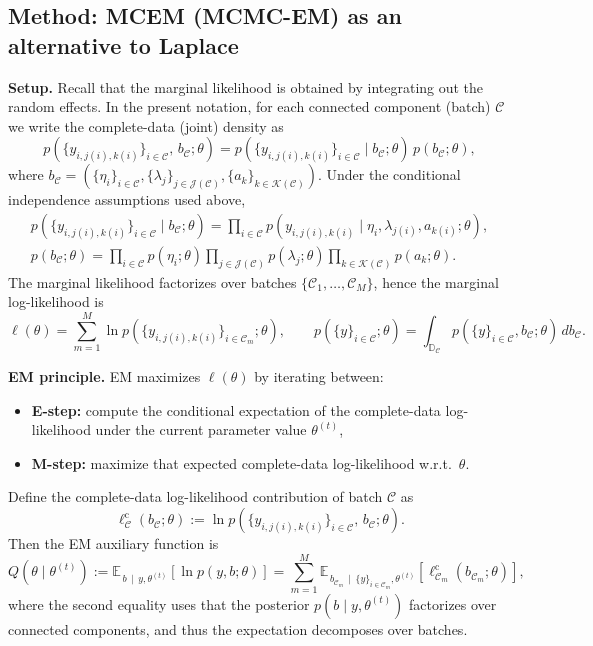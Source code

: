 \documentclass[12pt]{article}
\begin{document}

\subsection*{Method: MCEM (MCMC-EM) as an alternative to Laplace}

\textbf{Setup.}
Recall that the marginal likelihood is obtained by integrating out the random effects. In the present notation, for each connected component (batch) \(\mathcal{C}\) we write the complete-data (joint) density as
\[
p\!\left(\{y_{i,j(i),k(i)}\}_{i\in\mathcal{C}},\, b_{\mathcal{C}};\theta\right)
=
p\!\left(\{y_{i,j(i),k(i)}\}_{i\in\mathcal{C}} \mid b_{\mathcal{C}};\theta\right)\,
p\!\left(b_{\mathcal{C}};\theta\right),
\]
where \(b_{\mathcal{C}}=(\{\eta_i\}_{i\in\mathcal{C}},\{\lambda_j\}_{j\in\mathcal{J}(\mathcal{C})},\{a_k\}_{k\in\mathcal{K}(\mathcal{C})})\).
Under the conditional independence assumptions used above,
\[
\begin{aligned}
    p\!\left(\{y_{i,j(i),k(i)}\}_{i\in\mathcal{C}} \mid b_{\mathcal{C}};\theta\right)
=
\prod_{i\in\mathcal{C}} p\!\left(y_{i,j(i),k(i)} \mid \eta_i,\lambda_{j(i)},a_{k(i)};\theta\right),
\\
p(b_{\mathcal{C}};\theta)
=
\prod_{i\in\mathcal{C}}p(\eta_i;\theta)\prod_{j\in\mathcal{J}(\mathcal{C})}p(\lambda_j;\theta)\prod_{k\in\mathcal{K}(\mathcal{C})}p(a_k;\theta).
\end{aligned}
\]
The marginal likelihood factorizes over batches \(\{\mathcal{C}_1,\dots,\mathcal{C}_M\}\), hence the marginal log-likelihood is
\[
\ell(\theta)
=
\sum_{m=1}^M \ln p\!\left(\{y_{i,j(i),k(i)}\}_{i\in\mathcal{C}_m};\theta\right),
\qquad
p\!\left(\{y\}_{i\in\mathcal{C}};\theta\right)=\int_{\mathbb{D}_{\mathcal{C}}} p\!\left(\{y\}_{i\in\mathcal{C}},b_{\mathcal{C}};\theta\right)\,db_{\mathcal{C}}.
\]

\textbf{EM principle.}
EM maximizes \(\ell(\theta)\) by iterating between:
\begin{itemize}
\item \textbf{E-step:} compute the conditional expectation of the complete-data log-likelihood under the current parameter value \(\theta^{(t)}\),
\item \textbf{M-step:} maximize that expected complete-data log-likelihood w.r.t.\ \(\theta\).
\end{itemize}
Define the complete-data log-likelihood contribution of batch \(\mathcal{C}\) as
\[
\ell_{\mathcal{C}}^{\mathrm{c}}(b_{\mathcal{C}};\theta)
:=
\ln p\!\left(\{y_{i,j(i),k(i)}\}_{i\in\mathcal{C}},\, b_{\mathcal{C}};\theta\right).
\]
Then the EM auxiliary function is
\[
Q(\theta\mid\theta^{(t)})
:=
\mathbb{E}_{\,b\,\mid\,y,\theta^{(t)}}\!\left[\ln p(y,b;\theta)\right]
=
\sum_{m=1}^M
\mathbb{E}_{\,b_{\mathcal{C}_m}\,\mid\,\{y\}_{i\in\mathcal{C}_m},\theta^{(t)}}\!\left[
\ell_{\mathcal{C}_m}^{\mathrm{c}}(b_{\mathcal{C}_m};\theta)
\right],
\]
where the second equality uses that the posterior \(p(b\mid y,\theta^{(t)})\) factorizes over connected components, and thus the expectation decomposes over batches.
\end{document}
